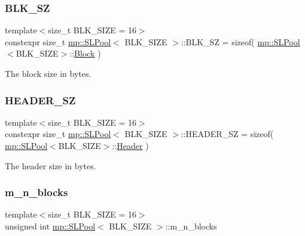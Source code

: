 \subsubsection{\texorpdfstring{B\+L\+K\+\_\+\+SZ}{BLK\_SZ}}
{\footnotesize\ttfamily template$<$size\+\_\+t B\+L\+K\+\_\+\+S\+I\+ZE = 16$>$ \\
constexpr size\+\_\+t \hyperlink{classmp_1_1_s_l_pool}{mp\+::\+S\+L\+Pool}$<$ B\+L\+K\+\_\+\+S\+I\+ZE $>$\+::B\+L\+K\+\_\+\+SZ = sizeof( \hyperlink{classmp_1_1_s_l_pool}{mp\+::\+S\+L\+Pool}$<$B\+L\+K\+\_\+\+S\+I\+ZE$>$\+::\hyperlink{structmp_1_1_s_l_pool_1_1_block}{Block} )\hspace{0.3cm}{\ttfamily [static]}}



The block size in bytes. 

\mbox{\label{classmp_1_1_s_l_pool_a6a08294207c41778969fa9316e1374dc}} 
\subsubsection{\texorpdfstring{H\+E\+A\+D\+E\+R\+\_\+\+SZ}{HEADER\_SZ}}
{\footnotesize\ttfamily template$<$size\+\_\+t B\+L\+K\+\_\+\+S\+I\+ZE = 16$>$ \\
constexpr size\+\_\+t \hyperlink{classmp_1_1_s_l_pool}{mp\+::\+S\+L\+Pool}$<$ B\+L\+K\+\_\+\+S\+I\+ZE $>$\+::H\+E\+A\+D\+E\+R\+\_\+\+SZ = sizeof( \hyperlink{classmp_1_1_s_l_pool}{mp\+::\+S\+L\+Pool}$<$B\+L\+K\+\_\+\+S\+I\+ZE$>$\+::\hyperlink{structmp_1_1_s_l_pool_1_1_header}{Header} )\hspace{0.3cm}{\ttfamily [static]}}



The header size in bytes. 

\mbox{\label{classmp_1_1_s_l_pool_ad0aad2c91ed55f7ce1e2f8c3da37006d}} 
\subsubsection{\texorpdfstring{m\+\_\+n\+\_\+blocks}{m\_n\_blocks}}
{\footnotesize\ttfamily template$<$size\+\_\+t B\+L\+K\+\_\+\+S\+I\+ZE = 16$>$ \\
unsigned int \hyperlink{classmp_1_1_s_l_pool}{mp\+::\+S\+L\+Pool}$<$ B\+L\+K\+\_\+\+S\+I\+ZE $>$\+::m\+\_\+n\+\_\+blocks\hspace{0.3cm}{\ttfamily [private]}}



